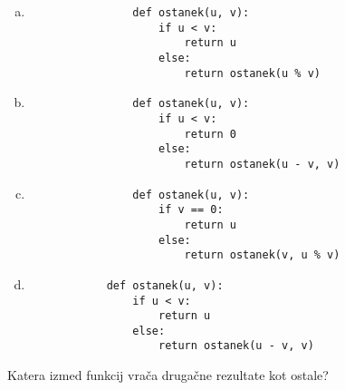 \documentclass[arhiv, 10pt]{../izpit}
\begin{document}
        \begin{multicols}{2}
        \begin{enumerate}[(a)]
\item 
                \begin{verbatim}
                def ostanek(u, v):
                    if u < v:
                        return u
                    else:
                        return ostanek(u % v)
                \end{verbatim}
            
\item 
                \begin{verbatim}
                def ostanek(u, v):
                    if u < v:
                        return 0
                    else:
                        return ostanek(u - v, v)
                \end{verbatim}
            
\item 
                \begin{verbatim}
                def ostanek(u, v):
                    if v == 0:
                        return u
                    else:
                        return ostanek(v, u % v)
                \end{verbatim}
            
\item 
            \begin{verbatim}
            def ostanek(u, v):
                if u < v:
                    return u
                else:
                    return ostanek(u - v, v)
            \end{verbatim}
        
\end{enumerate}

        \end{multicols}
    
        \naloga*
        
        Katera izmed funkcij vrača drugačne rezultate kot ostale?
    
\end{document}
